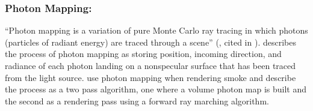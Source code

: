 \subsubsection{Photon Mapping:}
\label{sec:photon}
“Photon mapping is a variation of pure Monte Carlo ray tracing in which photons (particles of radiant energy) are traced through a scene” (\citet{Jensen96}, cited in \citet{MHarris03}).
\citet{MHarris03} describes the process of photon mapping as storing position, incoming direction, and radiance of each photon landing on a nonspecular surface that has been traced from the light source.
\citet*{Fedkiw01} use photon mapping when rendering smoke and describe the process as a two pass algorithm, one where a volume photon map is built and the second as a rendering pass using a forward ray marching algorithm.